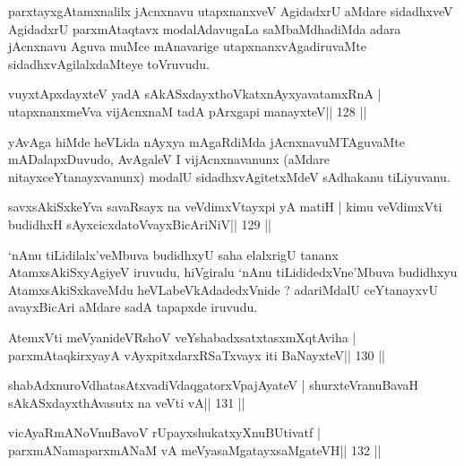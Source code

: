 \begin{artha}
parxtayxgAtamxnalilx jAcnxnavu utapxnanxveV AgidadxrU aMdare sidadhxveV AgidadxrU parxmAtaqtavx modalAdavugaLa saMbaMdhadiMda adara jAcnxnavu Aguva muMce mAnavarige utapxnanxvAgadiruvaMte sidadhxvAgilalxdaMteye toVruvudu.
\end{artha}


\begin{shl}
vuyxtApxdayxteV yadA sAkASxdayxthoVkatxnAyxyavatamxRnA |
utapxnanxmeVva vijAcnxnaM tadA pArxgapi manayxteV\hfill || 128 ||
\end{shl}

\begin{artha}
yAvAga hiMde heVLida nAyxya mAgaRdiMda jAcnxnavuMTAguvaMte mADalapx\-Duvudo, AvAgaleV I vijAcnxnavanunx (aMdare nitayxceYtanayxvanunx) modalU sidadhxvAgitetxMdeV sAdhakanu tiLiyuvanu.
\end{artha}

\begin{shl}
savxsAkiSxkeYva savaRsayx na veVdimxVtayxpi yA matiH |
kimu veVdimxVti budidhxH sAyxcicxdatoV\s vayxBicAriNiV\hfill || 129 ||
\end{shl}

\begin{artha}
`nAnu tiLidilalx'veMbuva budidhxyU saha elalxrigU tananx AtamxsAkiSxyAgiyeV iruvudu, hiVgiralu `nAnu tiLididedxVne'Mbuva budidhxyu AtamxsAkiSxkaveMdu heVLabeVkAdadedxVnide ? adariMdalU ceYtanayxvU avayxBicAri aMdare sadA tapapxde iruvudu.
\end{artha}


\begin{shl}
AtemxVti meVyanideVRshoV veYshabadxsatxtasxmXqtAviha |
parxmAtaqkirxyayA vAyxpitxdarxRSaTxvayx iti BaNayxteV\hfill || 130 ||
\end{shl}

\begin{shl}
shabAdxnuroVdhatasAtxvadiVdaqgatorxVpajAyateV |
shurxteVranuBavaH sAkASxdayxthAvasutx na veVti vA\hfill || 131 ||
\end{shl}

\begin{shl}
vicAyaRmANoV\s nuBavoV rUpayxshukatxyXnuBUtivatf |
parxmANamaparxmANaM vA meVyasaMgatayxsaMgateVH\hfill || 132 ||
\end{shl}

